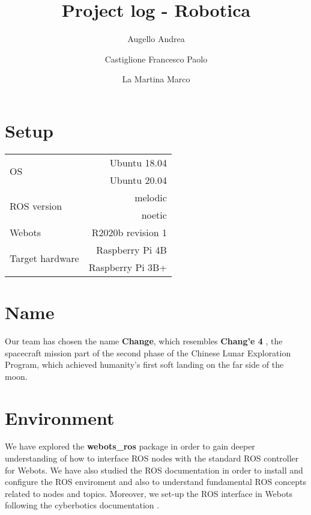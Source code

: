 \documentclass[a4paper]{article}
\begin{document}
	\title{Project log - Robotica}
	\author{Augello Andrea \and Castiglione Francesco Paolo \and La Martina Marco}
	\maketitle
	\tableofcontents

	\section{Setup}\label{sec:Setup}
	\begin{tabular}{|l|r|}
		\hline
		\multirow{2}{4em}{OS} & Ubuntu 18.04 \\
							  & Ubuntu 20.04 \\ \hline
		\multirow{2}{6em}{ROS version} & melodic \\
									   & noetic \\ \hline
		Webots & R2020b revision 1\\ \hline
		\multirow{2}{11em}{Target hardware} & Raspberry Pi 4B \\
											& Raspberry Pi 3B+ \\ \hline
	\end{tabular}

	\section{Name}\label{sec:Name}
	Our team has chosen the name \textbf{Change}, which resembles \textbf{Chang'e 4} \cite{change4}, the spacecraft mission part of the second phase of the Chinese Lunar Exploration Program, which achieved humanity's first soft landing on the far side of the moon.

	\section{Environment}\label{sec:Libraries}
	We have explored the \textbf{webots\_ros} \cite{webotsRos} package in order to gain deeper understanding of how to interface ROS nodes with the standard ROS controller for Webots. We have also studied the ROS documentation \cite{rosTutorial} in order to install and configure the ROS enviroment and also to understand fundamental ROS concepts related to nodes and topics.
	Moreover, we set-up the ROS interface in Webots following the cyberbotics documentation \cite{rosTutorial}.
	
\end{document}
